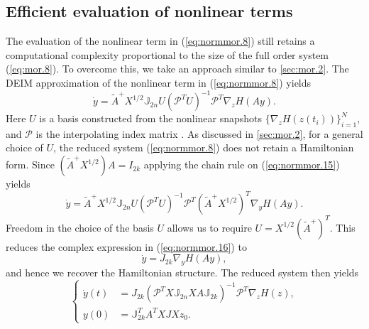 \subsection{Efficient evaluation of nonlinear terms} \label{sec:normmor.3}
The evaluation of the nonlinear term in (\ref{eq:normmor.8}) still retains a computational complexity proportional to the size of the full order system (\ref{eq:mor.8}). To overcome this, we take an approach similar to \cref{sec:mor.2}. The DEIM approximation of the nonlinear term in (\ref{eq:normmor.8}) yields
\begin{equation} \label{eq:normmor.15}
	\dot y = \tilde A ^+ X^{1/2} \mathbb J_{2n} U (\mathcal P^TU)^{-1}\mathcal  P^T \nabla_z H(Ay).
\end{equation}
Here $U$ is a basis constructed from the nonlinear snapshots $\{\nabla_z H(z(t_i))\}_{i=1}^N$, and $\mathcal P$ is the interpolating index matrix \cite{Chaturantabut:2010cz}. As discussed in \cref{sec:mor.2}, for a general choice of $U$, the reduced system (\ref{eq:normmor.8}) does not retain a Hamiltonian form. Since $(\tilde A^+ X^{1/2}) A = I_{2k}$ applying the chain rule on (\ref{eq:normmor.15}) yields
\begin{equation} \label{eq:normmor.16}
	\dot y = \tilde A ^+ X^{1/2} \mathbb J_{2n} U (\mathcal P^TU)^{-1} \mathcal P^T (\tilde A^+ X^{1/2})^T \nabla_y H(Ay).
\end{equation}
Freedom in the choice of the basis $U$ allows us to require $U = X^{1/2} (\tilde A^+)^T$. This reduces the complex expression in (\ref{eq:normmor.16}) to
\begin{equation} \label{eq:normmor.17}
	\dot y = J_{2k} \nabla_y H(Ay),
\end{equation}
and hence we recover the Hamiltonian structure. The reduced system then yields
\begin{equation} \label{eq:normmor.18}
\left\{
\begin{aligned}
	\dot y(t) &= J_{2k} (\mathcal P^TX \mathbb J_{2n} X A \mathbb J_{2k})^{-1} \mathcal P^T \nabla_z H(z), \\
	y(0) &= \mathbb J_{2k}^T A^T X J X z_0.
\end{aligned}
\right.
\end{equation}
